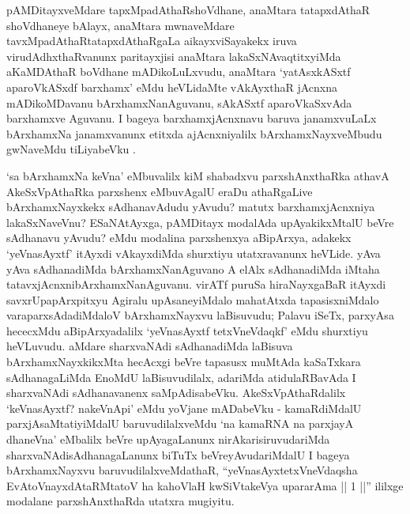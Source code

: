 
\begin{artha}
pAMDitayxveMdare tapxMpadAthaRshoVdhane, anaMtara tatapxdAthaR shoVdhaneye bAlayx, anaMtara mwnaveMdare tavxMpadAthaRtatapxdAthaRgaLa aikayxviSayakekx iruva virudAdhxthaRvanunx paritayxjisi anaMtara lakaSxNAvaqtitxyiMda aKaMDAthaR boVdhane mADikoLuLxvudu, anaMtara `yatAsxkASxtf aparoVkASxdf barxhamx' eMdu heVLidaMte vAkAyxthaR jAcnxna mADikoMDavanu bArxhamxNanAguvanu, sAkASxtf aparoVkaSxvAda barxhamxve Aguvanu. I bageya barxhamxjAcnxnavu baruva janamxvuLaLx bArxhamxNa janamxvanunx etitxda ajAcnxniyalilx bArxhamxNayxveMbudu gwNaveMdu tiLiyabeVku .
\end{artha}


\begin{artha}
`sa bArxhamxNa keVna' eMbuvalilx kiM shabadxvu parxshAnxthaRka athavA AkeSxVpAthaRka parxshenx eMbuvAgalU eraDu athaRgaLive \ndash  bArxhamxNayxkekx sAdhanavAdudu yAvudu? matutx barxhamxjAcnxniya lakaSxNaveVnu? ESaNAtAyxga, pAMDitayx modalAda upAyakikxMtalU beVre sAdhanavu yAvudu? eMdu modalina parxshenxya aBipArxya, adakekx `yeVnasAyxtf' itAyxdi vAkayxdiMda shurxtiyu utatxravanunx heVLide. yAva yAva sAdhanadiMda bArxhamxNanAguvano A elAlx sAdhanadiMda iMtaha tatavxjAcnxnibArxhamxNanAguvanu. virATf puruSa hiraNayxgaBaR itAyxdi savxrUpapArxpitxyu Agiralu upAsaneyiMdalo mahatAtxda tapasisxniMdalo varaparxsAdadiMdaloV bArxhamxNayxvu laBisuvudu; Palavu iSeTx, parxyAsa hececxMdu aBipArxyadalilx `yeVnasAyxtf tetxVneVdaqkf' eMdu shurxtiyu heVLuvudu. aMdare sharxvaNAdi sAdhanadiMda laBisuva bArxhamxNayxkikxMta hecAcxgi beVre tapasusx muMtAda kaSaTxkara sAdhanagaLiMda EnoMdU laBisuvudilalx, adariMda atidulaRBavAda I sharxvaNAdi sAdhanavanenx saMpAdisabeVku. AkeSxVpAthaRdalilx `keVnasAyxtf? nakeVnApi' eMdu yoVjane mADabeVku - kamaRdiMdalU parxjAsaMtatiyiMdalU baruvudilalxveMdu `na kamaRNA na parxjayA dhaneVna' eMbalilx beVre upAyagaLanunx nirAkarisiruvudariMda sharxvaNAdisAdhanagaLanunx biTuTx beVreyAvudariMdalU I bageya bArxhamxNayxvu baruvudilalxveMdathaR, ``yeVnasAyxtetxVneVdaqsha EvAtoV\s nayxdAtaRMtatoV ha kahoVlaH kwSiVtakeVya upararAma || 1 ||'' ililxge modalane parxshAnxthaRda utatxra mugiyitu.
\end{artha}

